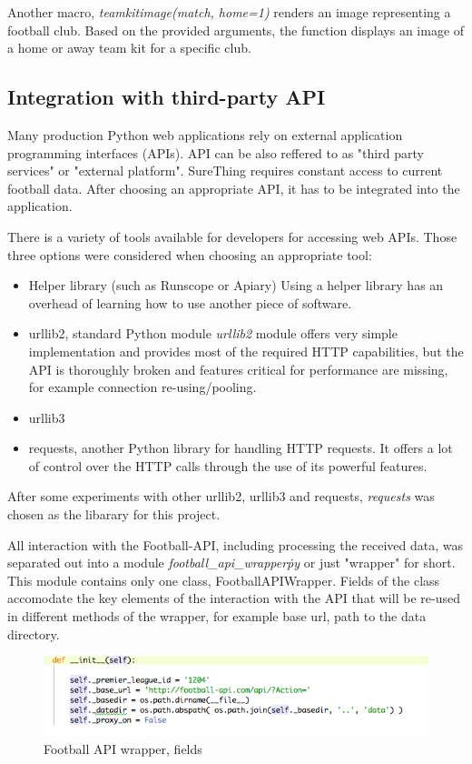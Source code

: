 Another macro, \emph{teamkitimage(match, home=1)} renders an image representing a football club. Based on the provided arguments, the function displays an image of a home or away team kit for a specific club. 

\subsection{Integration with third-party API}
Many production Python web applications rely on external application programming interfaces (APIs). API can be also reffered to as "third party services" or "external platform".\cite{apiintegration}  SureThing requires constant access to current football data. After choosing an appropriate API, it has to be integrated into the application. 

There is a variety of tools available for developers for accessing web APIs. Those three options were considered when choosing an appropriate tool:
	
\begin{itemize}
	\item Helper library (such as Runscope or Apiary)
	Using a helper library has an overhead of learning how to use another piece of software.
	\item urllib2, standard Python module
	\emph{urllib2} module offers very simple implementation and provides most of the required HTTP capabilities, but the API is thoroughly broken and features critical for performance are missing, for example connection re-using/pooling. 
	\item urllib3
	\item requests, another Python library for handling HTTP requests. It offers a lot of control over the HTTP calls through the use of its powerful features.
\end{itemize}
		
After some experiments with other urllib2, urllib3 and requests, \emph{requests} was chosen as the libarary for this project.
		
All interaction with the Football-API, including processing the received data, was separated out into a module \emph{football\_api\_wrapper\.py} or just "wrapper" for short. This module contains only one class, FootballAPIWrapper. Fields of the class accomodate the key elements of the interaction with the API that will be re-used in different methods of the wrapper, for example base url, path to the data directory.
	
\begin{figure}[H]
	\begin{center}
		\includegraphics[width=.90\linewidth,natwidth=610,natheight=642]{impl/images/footballApiWrapperFields}
		\caption{Football API wrapper, fields} \label{fig:using:footballapiwrapperfields}
	\end{center}
\end{figure}
	
